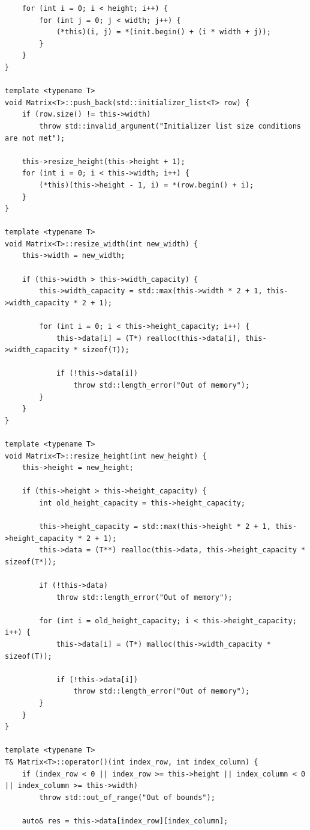 \documentclass[a4paper,14pt]{extarticle}
\begin{document}
\begin{verbatim}
    for (int i = 0; i < height; i++) {
        for (int j = 0; j < width; j++) {
            (*this)(i, j) = *(init.begin() + (i * width + j));
        }
    }
}

template <typename T>
void Matrix<T>::push_back(std::initializer_list<T> row) {
    if (row.size() != this->width)
        throw std::invalid_argument("Initializer list size conditions are not met");

    this->resize_height(this->height + 1);
    for (int i = 0; i < this->width; i++) {
        (*this)(this->height - 1, i) = *(row.begin() + i);
    }
}

template <typename T>
void Matrix<T>::resize_width(int new_width) {
    this->width = new_width;

    if (this->width > this->width_capacity) {
        this->width_capacity = std::max(this->width * 2 + 1, this->width_capacity * 2 + 1);

        for (int i = 0; i < this->height_capacity; i++) {
            this->data[i] = (T*) realloc(this->data[i], this->width_capacity * sizeof(T));

            if (!this->data[i])
                throw std::length_error("Out of memory");
        }
    }
}

template <typename T>
void Matrix<T>::resize_height(int new_height) {
    this->height = new_height;

    if (this->height > this->height_capacity) {
        int old_height_capacity = this->height_capacity;

        this->height_capacity = std::max(this->height * 2 + 1, this->height_capacity * 2 + 1);
        this->data = (T**) realloc(this->data, this->height_capacity * sizeof(T*));

        if (!this->data)
            throw std::length_error("Out of memory");

        for (int i = old_height_capacity; i < this->height_capacity; i++) {
            this->data[i] = (T*) malloc(this->width_capacity * sizeof(T));

            if (!this->data[i])
                throw std::length_error("Out of memory");
        }
    }
}

template <typename T>
T& Matrix<T>::operator()(int index_row, int index_column) {
    if (index_row < 0 || index_row >= this->height || index_column < 0 || index_column >= this->width)
        throw std::out_of_range("Out of bounds");

    auto& res = this->data[index_row][index_column];


\end{verbatim}
\end{document}
